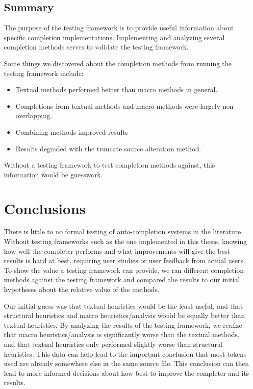 \documentclass[ms,electronic,twosidetoc,letterpaper,chaptercenter,parttop,lol,lof,lot]{byumsphd}
\begin{document}
\section{Summary}

The purpose of the testing framework is to provide useful information about specific completion implementations.
Implementing and analyzing several completion methods serves to validate the testing framework.

Some things we discovered about the completion methods from running the testing framework include:

\begin{itemize}

\item Textual methods performed better than macro methods in general.
\item Completions from textual methods and macro methods were largely non-overlapping.
\item Combining methods improved results
\item Results degraded with the truncate source alteration method.

\end{itemize}

Without a testing framework to test completion methods against, this information would be guesswork.

\chapter{Conclusions}

There is little to no formal testing of auto-completion systems in the literature.
Without testing frameworks such as the one implemented in this thesis, knowing how well the completer performs and what improvements will give the best results is hard at best, requiring user studies or user feedback from actual users.
To show the value a testing framework can provide, we ran different completion methods against the testing framework and compared the results to our initial hypotheses about the relative value of the methods.

Our initial guess was that textual heuristics would be the least useful, and that structural heuristics and macro heuristics/analysis would be equally better than textual heuristics.
By analyzing the results of the testing framework, we realize that macro heuristics/analysis is significantly worse than the textual methods, and that textual heuristics only performed slightly worse than structural heuristics.
This data can help lead to the important conclusion that most tokens used are already somewhere else in the same source file.
This conclusion can then lead to more informed decisions about how best to improve the completer and its results.
\end{document}
